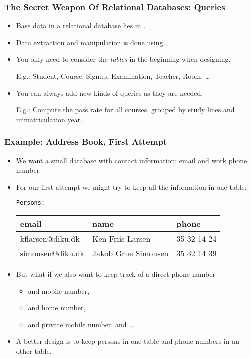 \documentclass[dvipsnames,handout]{beamer}
\begin{document}
\begin{frame}[squeeze]
\frametitle{The Secret Weapon Of Relational Databases: Queries}

    \begin{itemize}
    \item Base data in a relational database lies in .

    \item Data extraction and manipulation is done using
      .

    \item You only need to consider the \emph{tables} in the
      beginning when designing.

      E.g.: Student, Course, Signup, Examination, Teacher, Room,
      \ldots

    \item You can always add new kinds of queries as they are needed.
     
      E.g.: Compute the pass rate for all courses, grouped by study
      lines and immatriculation year.

    \end{itemize}

\end{frame}



\begin{frame}
\frametitle{Example: Address Book, First Attempt}

\begin{itemize}
\item We want a small database with contact information: email and
  work phone number

\item<+-> For our first attempt we might try to keep all the information
  in one table:

  \texttt{Persons:}\\
  \begin{tabular}{|l|l|l|}
    \hline
    email & name & phone\\\hline
    kflarsen@diku.dk & Ken Friis Larsen & 35 32 14 24 \\
    simonsen@diku.dk & Jakob Grue Simonsen & 35 32 14 39 \\
    \hline
  \end{tabular}

\item<+-> But what if we also want to keep track of a direct phone number
  \begin{itemize}
  \item<+-> and mobile number,
  \item<+-> and home number,
  \item<+-> and private mobile number, and \ldots
  \end{itemize}
\item<+-> A better design is to keep persons in one table and phone
  numbers in an other table.

\end{itemize}
\end{frame}
\end{document}
